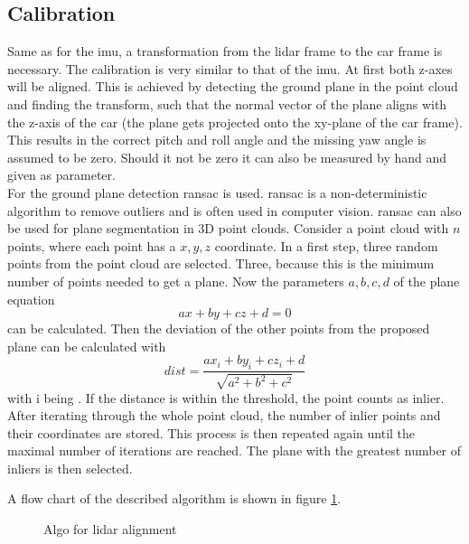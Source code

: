 \subsection{Calibration}
Same as for the \acrshort{imu}, a transformation from the \acrshort{lidar} frame to the car frame is necessary.
The calibration is very similar to that of the \acrshort{imu}.
At first both z-axes will be aligned.
This is achieved by detecting the ground plane in the point cloud and finding the transform, such that the normal vector of the plane aligns with the z-axis of the car (the plane gets projected onto the xy-plane of the car frame).
This results in the correct pitch and roll angle and the missing yaw angle is assumed to be zero.
Should it not be zero it can also be measured by hand and given as parameter.\\
For the ground plane detection \acrfull{ransac} \cite{Fischler1981} is used.
\acrshort{ransac} is a non-deterministic algorithm to remove outliers and is often used in computer vision.
\acrshort{ransac} can also be used for plane segmentation in 3D point clouds.
Consider a point cloud with $n$ points, where each point has a $x, y, z$ coordinate.
In a first step, three random points from the point cloud are selected.
Three, because this is the minimum number of points needed to get a plane.
Now the parameters $a, b, c, d$ of the plane equation
\begin{equation}
    ax + by + cz + d = 0
\end{equation}
can be calculated.
Then the deviation of the other points from the proposed plane can be calculated with
\begin{equation}
    dist = \frac{ax_i + by_i + cz_i + d}{\sqrt{a^2 + b^2 + c^2}}
\end{equation}
with i being .
If the distance is within the threshold, the point counts as inlier.
After iterating through the whole point cloud, the number of inlier points and their coordinates are stored.
This process is then repeated again until the maximal number of iterations are reached.
The plane with the greatest number of inliers is then selected.

A flow chart of the described algorithm is shown in figure \ref{fig:flowchart_lidar_calibration}.

\begin{figure}[htb]
    \centering
    
    \caption{Algo for \acrshort{lidar} alignment}
    \label{fig:flowchart_lidar_calibration}
\end{figure}

